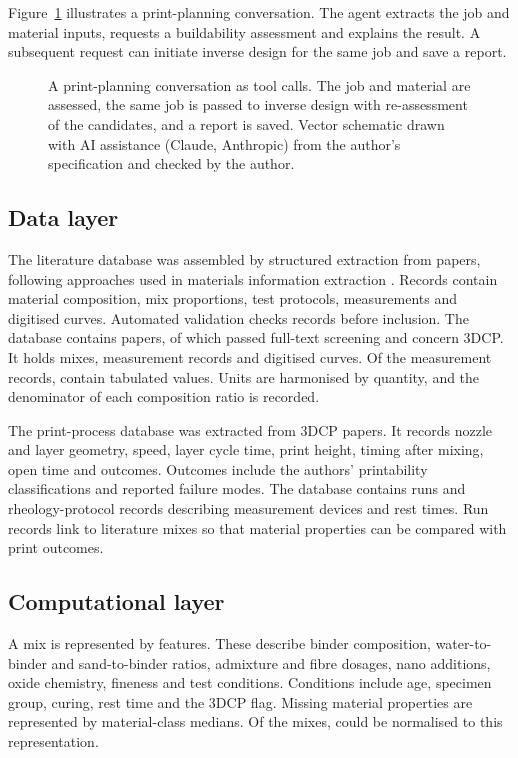 \documentclass[preprint,12pt]{elsarticle}
\newcommand{\aidisclosure}{Vector schematic drawn with AI assistance (Claude, Anthropic) from the author's specification and checked by the author.}
\begin{document}
Figure~\ref{fig:seq} illustrates a print-planning conversation. The agent extracts the job and material inputs, requests a buildability assessment and explains the result. A subsequent request can initiate inverse design for the same job and save a report.

\begin{figure}[t]
\centering
\resizebox{\textwidth}{!}{}
\caption{A print-planning conversation as tool calls. The job and material are assessed, the same job is passed to inverse design with re-assessment of the candidates, and a report is saved. \aidisclosure}
\label{fig:seq}
\end{figure}

\subsection{Data layer}

The literature database was assembled by structured extraction from papers, following approaches used in materials information extraction \cite{dagdelen2024structured,polak2024extracting}. Records contain material composition, mix proportions, test protocols, measurements and digitised curves. Automated validation checks records before inclusion. The database contains \npapers{} papers, of which \npapersIncluded{} passed full-text screening and \npapersThreeDCP{} concern 3DCP. It holds \nmixes{} mixes, \nmeasurements{} measurement records and \ncurves{} digitised curves. Of the measurement records, \nmeasurementsValued{} contain tabulated values. Units are harmonised by quantity, and the denominator of each composition ratio is recorded.

The print-process database was extracted from \nprintPapers{} 3DCP papers. It records nozzle and layer geometry, speed, layer cycle time, print height, timing after mixing, open time and outcomes. Outcomes include the authors' printability classifications and reported failure modes. The database contains \nprintRuns{} runs and \nprotocolRows{} rheology-protocol records describing measurement devices and rest times. Run records link to literature mixes so that material properties can be compared with print outcomes.

\subsection{Computational layer}

A mix is represented by \nnFeatures{} features. These describe binder composition, water-to-binder and sand-to-binder ratios, admixture and fibre dosages, nano additions, oxide chemistry, fineness and test conditions. Conditions include age, specimen group, curing, rest time and the 3DCP flag. Missing material properties are represented by material-class medians. Of the \nmixes{} mixes, \nnMixesNorm{} could be normalised to this representation.
\end{document}
